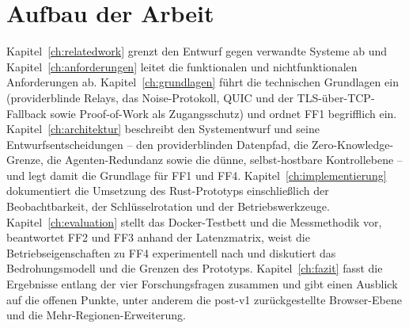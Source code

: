\section{Aufbau der Arbeit}
\label{sec:aufbau}

Kapitel~\ref{ch:relatedwork} grenzt den Entwurf gegen verwandte Systeme ab und
Kapitel~\ref{ch:anforderungen} leitet die funktionalen und nichtfunktionalen
Anforderungen ab. Kapitel~\ref{ch:grundlagen} führt die technischen Grundlagen ein
(providerblinde Relays, das Noise-Protokoll, QUIC und der TLS-über-TCP-Fallback
sowie Proof-of-Work als Zugangsschutz) und ordnet FF1 begrifflich ein.
Kapitel~\ref{ch:architektur} beschreibt den Systementwurf und seine
Entwurfsentscheidungen -- den providerblinden Datenpfad, die Zero-Knowledge-Grenze,
die Agenten-Redundanz sowie die dünne, selbst-hostbare Kontrollebene -- und legt
damit die Grundlage für FF1 und FF4. Kapitel~\ref{ch:implementierung}
dokumentiert die Umsetzung des Rust-Prototyps einschließlich der
Beobachtbarkeit, der Schlüsselrotation und der Betriebswerkzeuge.
Kapitel~\ref{ch:evaluation} stellt das Docker-Testbett und die Messmethodik vor,
beantwortet FF2 und FF3 anhand der Latenzmatrix, weist die Betriebseigenschaften
zu FF4 experimentell nach und diskutiert das Bedrohungsmodell und die Grenzen des
Prototyps. Kapitel~\ref{ch:fazit} fasst die Ergebnisse entlang der vier
Forschungsfragen zusammen und gibt einen Ausblick auf die offenen Punkte, unter
anderem die post-v1 zurückgestellte Browser-Ebene und die Mehr-Regionen-Erweiterung.
